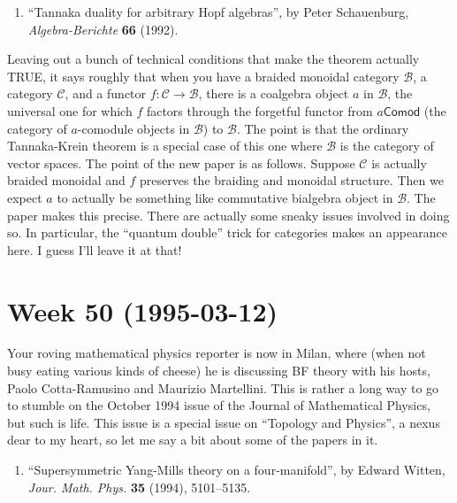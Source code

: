 \documentclass{article}
\def\tightlist{}
\begin{document}
\begin{enumerate}
\def\labelenumi{\arabic{enumi})}
\setcounter{enumi}{4}
\tightlist
\item
  ``Tannaka duality for arbitrary Hopf algebras'', by Peter Schauenburg,
  \emph{Algebra-Berichte} \textbf{66} (1992).
\end{enumerate}

Leaving out a bunch of technical conditions that make the theorem
actually TRUE, it says roughly that when you have a braided monoidal
category \(\mathcal{B}\), a category \(\mathcal{C}\), and a functor
\(f\colon \mathcal{C} \to \mathcal{B}\), there is a coalgebra object
\(a\) in \(\mathcal{B}\), the universal one for which \(f\) factors
through the forgetful functor from \(a\mathsf{Comod}\) (the category of
\(a\)-comodule objects in \(\mathcal{B}\)) to \(\mathcal{B}\). The point
is that the ordinary Tannaka-Krein theorem is a special case of this one
where \(\mathcal{B}\) is the category of vector spaces. The point of the
new paper is as follows. Suppose \(\mathcal{C}\) is actually braided
monoidal and \(f\) preserves the braiding and monoidal structure. Then
we expect \(a\) to actually be something like commutative bialgebra
object in \(\mathcal{B}\). The paper makes this precise. There are
actually some sneaky issues involved in doing so. In particular, the
``quantum double'' trick for categories makes an appearance here. I
guess I'll leave it at that!
\hypertarget{week50}{%
\section{Week 50 (1995-03-12)}\label{week50}}

Your roving mathematical physics reporter is now in Milan, where (when
not busy eating various kinds of cheese) he is discussing BF theory with
his hosts, Paolo Cotta-Ramusino and Maurizio Martellini. This is rather
a long way to go to stumble on the October 1994 issue of the Journal of
Mathematical Physics, but such is life. This issue is a special issue on
``Topology and Physics'', a nexus dear to my heart, so let me say a bit
about some of the papers in it.

\begin{enumerate}
\def\labelenumi{\arabic{enumi})}
\tightlist
\item
  ``Supersymmetric Yang-Mills theory on a four-manifold'', by Edward
  Witten, \emph{Jour. Math. Phys.} \textbf{35} (1994), 5101--5135.
\end{enumerate}
\end{document}
